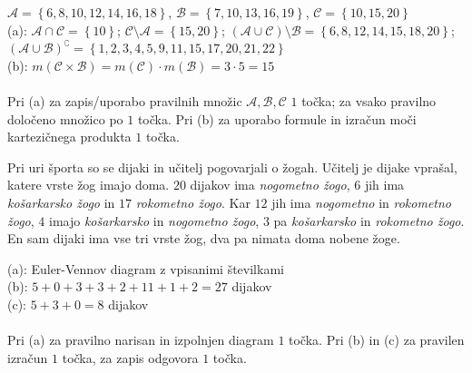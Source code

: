 \documentclass[addpoints]{exam}
\begin{document}
\begin{questions}
    \begin{solution}[9cm]
        $\mathcal{A}=\left\{6,8,10,12,14,16,18\right\}$, $\mathcal{B}=\left\{7,10,13,16,19\right\}$, $\mathcal{C}=\left\{10,15,20\right\}$ \\
        (a): $\mathcal{A}\cap\mathcal{C}=\left\{10\right\}$; $\mathcal{C}\setminus\mathcal{A}=\left\{15,20\right\}$; $(\mathcal{A}\cup\mathcal{C})\setminus\mathcal{B}=\left\{6,8,12,14,15,18,20\right\}$; $(\mathcal{A}\cup\mathcal{B})^\complement=\left\{1,2,3,4,5,9,11,15,17,20,21,22\right\}$ \\
        (b): $m(\mathcal{C}\times\mathcal{B})=m(\mathcal{C})\cdot m(\mathcal{B})=3\cdot 5 = 15$ \\ \\
        Pri (a) za zapis/uporabo pravilnih množic $\mathcal{A}, \mathcal{B}, \mathcal{C}$ $1$ točka; za vsako pravilno določeno množico po $1$ točka. Pri (b) za uporabo formule in izračun moči kartezičnega produkta $1$ točka.
    \end{solution}


\newpage
    \question
    Pri uri športa so se dijaki in učitelj pogovarjali o žogah.  Učitelj je dijake vprašal, katere vrste žog imajo doma.
    $20$ dijakov ima \textit{nogometno žogo}, $6$ jih ima \textit{košarkarsko žogo} in $17$ \textit{rokometno žogo}. Kar $12$ jih ima \textit{nogometno} in \textit{rokometno žogo}, $4$ imajo \textit{košarkarsko} in \textit{nogometno žogo},
    $3$ pa \textit{košarkarsko} in \textit{rokometno žogo}. En sam dijaki ima vse tri vrste žog, dva pa nimata doma nobene žoge. 

    \begin{solution}[8cm]
        (a): Euler-Vennov diagram z vpisanimi številkami \\
        (b): $5+0+3+3+2+11+1+2=27$ dijakov \\
        (c): $5+3+0=8$ dijakov \\ \\
        Pri (a) za pravilno narisan in izpolnjen diagram $1$ točka. Pri (b) in (c) za pravilen izračun $1$ točka, za zapis odgovora $1$ točka.
    \end{solution}





\end{questions}
\end{document}
